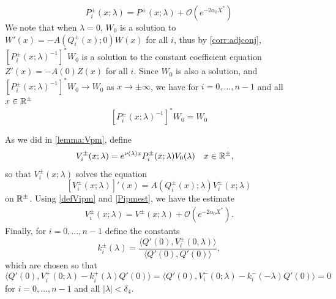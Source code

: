 \documentclass[10pt,reqno]{amsart}
\theoremstyle{plain}
\theoremstyle{definition}
\theoremstyle{remark}
\numberwithin{theorem}{section}
\numberwithin{equation}{section}
\begin{document}
\begin{equation}\label{Pipmest}
P_i^\pm(x; \lambda) = P^\pm(x; \lambda) + \mathcal{O}(e^{-2 \alpha_0 X^*})
\end{equation}
We note that when $\lambda = 0$, $W_0$ is a solution to $W'(x) = -A(Q_i^\pm(x); 0) W(x)$ for all $i$, thus by \cref{corr:adjconj}, $[P_i^\pm(x; \lambda)^{-1}]^* W_0$ is a solution to the constant coefficient equation $Z'(x) = -A(0) Z(x)$ for all $i$. Since $W_0$ is also a solution, and $[P_i^\pm(x; \lambda)^{-1}]^* W_0 \rightarrow W_0$ as $x \rightarrow \pm \infty$, we have for $i = 0, \dots, n-1$ and all $x \in \mathbb{R}^\pm$
\begin{equation}\label{W0conjeq}
[P_i^\pm(x; \lambda)^{-1}]^* W_0 = W_0
\end{equation}

As we did in \cref{lemma:Vpm}, define
\begin{align}\label{defVipm}
V_i^\pm(x; \lambda) &= e^{\nu(\lambda)x} P_i^\pm(x; \lambda)V_0(\lambda) && x \in \mathbb{R}^\pm,
\end{align}
so that $V_i^\pm(x; \lambda)$ solves the equation
\begin{equation}\label{PDEeigcenter}
[V_i^\pm(x; \lambda)]'(x) = A(Q_i^\pm(x); \lambda) V_i^\pm(x; \lambda)
\end{equation}
on $\mathbb{R}^\pm$. Using \cref{defVipm} and \cref{Pipmest}, we have the estimate
\begin{align}\label{Vipmest}
V_i^\pm(x; \lambda) = V^\pm(x; \lambda) + \mathcal{O}(e^{-2 \alpha_0 X^*}).
\end{align}
Finally, for $i = 0, \dots, n-1$ define the constants
\begin{equation}\label{defklambda}
k_i^\pm(\lambda) = \frac{\langle Q'(0), V_i^\pm(0, \lambda) \rangle}{\langle Q'(0), Q'(0) \rangle},
\end{equation}
which are chosen so that
\begin{equation}\label{klambdaIP}
\langle Q'(0), V_i^+(0; \lambda) - k_i^+(\lambda)Q'(0) \rangle = 
\langle Q'(0), V_i^-(0; \lambda) - k_i^-(-\lambda)Q'(0) \rangle = 0
\end{equation}
for $i = 0, \dots, n-1$ and all $|\lambda| < \delta_4$. 
\end{document}
